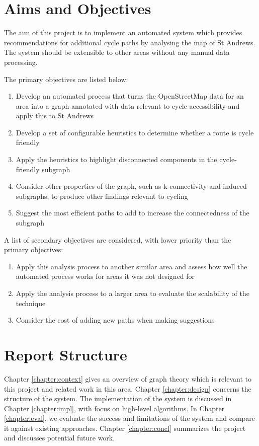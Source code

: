 \documentclass[12pt,a4paper]{report}
\begin{document}
\section{Aims and Objectives} \label{sec:aims}
The aim of this project is to implement an automated system which provides recommendations for additional cycle paths by analysing the map of St Andrews. The system should be extensible to other areas without any manual data processing.

The primary objectives are listed below:
\begin{enumerate}
    \item Develop an automated process that turns the OpenStreetMap data for an area into a graph annotated with data relevant to cycle accessibility and apply this to St Andrews
    \item Develop a set of configurable heuristics to determine whether a route is cycle friendly
    \item Apply the heuristics to highlight disconnected components in the cycle-friendly subgraph
    \item Consider other properties of the graph, such as k-connectivity and induced subgraphs, to produce other findings relevant to cycling
    \item Suggest the most efficient paths to add to increase the connectedness of the subgraph
\end{enumerate}

A list of secondary objectives are considered, with lower priority than the primary objectives:
\begin{enumerate}
    \item Apply this analysis process to another similar area and assess how well the automated process works for areas it was not designed for
    \item Apply the analysis process to a larger area to evaluate the scalability of the technique
    \item Consider the cost of adding new paths when making suggestions
\end{enumerate}

\section{Report Structure}
Chapter \ref{chapter:context} gives an overview of graph theory which is relevant to this project and related work in this area. Chapter \ref{chapter:design} concerns the structure of the system. The implementation of the system is discussed in Chapter \ref{chapter:impl}, with focus on high-level algorithms. In Chapter \ref{chapter:eval}, we evaluate the success and limitations of the system and compare it against existing approaches. Chapter \ref{chapter:concl} summarizes the project and discusses potential future work.
\end{document}
